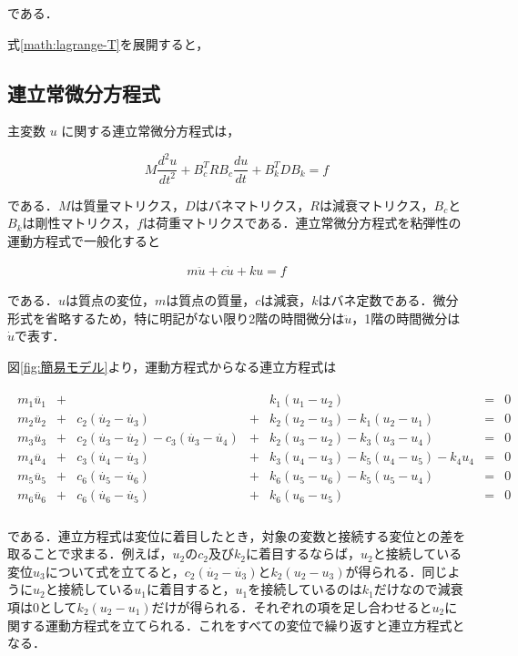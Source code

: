 である．

式\ref{math:lagrange-T}を展開すると，



\subsection{連立常微分方程式}

主変数 $u$ に関する連立常微分方程式は，

\begin{equation}
    M \frac{d^2 u}{dt^2} + B_c^T R B_c \frac{du}{dt} + B_k^T D B_k = f    
\end{equation}

である．$M$は質量マトリクス，$D$はバネマトリクス，$R$は減衰マトリクス，$B_c$と$B_k$は剛性マトリクス，$f$は荷重マトリクスである．連立常微分方程式を粘弾性の運動方程式で一般化すると

\begin{eqnarray}
    m\ddot{u} + c\dot{u} + ku = f
\end{eqnarray}

である．$u$は質点の変位，$m$は質点の質量，$c$は減衰，$k$はバネ定数である．微分形式を省略するため，特に明記がない限り2階の時間微分は$\ddot{u}$，1階の時間微分は$\dot{u}$で表す．

図\ref{fig:簡易モデル}より，運動方程式からなる連立方程式は

\begin{eqnarray}
    \begin{matrix}
        m_1 \ddot{u_1} &+&  & & k_1 (u_1 - u_2) &=& 0 \\ 
        m_2 \ddot{u_2} &+& c_2(\dot{u_2} - \dot{u_3}) &+& k_2 (u_2 - u_3) - k_1 (u_2 - u_1) &=& 0 \\ 
        m_3 \ddot{u_3} &+& c_2(\dot{u_3} - \dot{u_2}) - c_3(\dot{u_3} - \dot{u_4}) &+& k_2 (u_3 - u_2) - k_3 (u_3 - u_4) &=& 0 \\ 
        m_4 \ddot{u_4} &+& c_3(\dot{u_4} - \dot{u_3}) &+& k_3 (u_4 - u_3) - k_5 (u_4 - u_5) - k_4 u_4 &=& 0 \\ 
        m_5 \ddot{u_5} &+& c_6(\dot{u_5} - \dot{u_6}) &+& k_6 (u_5 - u_6) - k_5 (u_5 - u_4) &=& 0 \\
        m_6 \ddot{u_6} &+& c_6(\dot{u_6} - \dot{u_5}) &+& k_6 (u_6 - u_5) &=& 0 \\
    \end{matrix}        
\end{eqnarray}

である．連立方程式は変位に着目したとき，対象の変数と接続する変位との差を取ることで求まる．例えば，$u_2$の$c_2$及び$k_2$に着目するならば，$u_2$と接続している変位$u_3$について式を立てると，$c_2(\dot{u_2} - \dot{u_3})$と$k_2(u_2 - u_3)$が得られる．同じように$u_2$と接続している$u_1$に着目すると，$u_1$を接続しているのは$k_1$だけなので減衰項は$0$として$k_2(u_2 - u_1)$だけが得られる．それぞれの項を足し合わせると$u_2$に関する運動方程式を立てられる．これをすべての変位で繰り返すと連立方程式となる．


